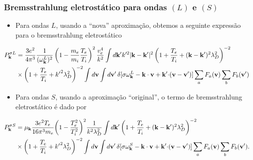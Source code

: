 \documentclass[10pt,aspectratio=1610,lualatex]{beamer}
\begin{document}
\begin{frame}
  \frametitle{Bremsstrahlung eletrostático para ondas $(L)$ e $(S)$}
  \begin{itemize}
    \item Para ondas $L$, usando a ``nova'' aproximação, obtemos a seguinte
    expressão para o bremsstrahlung eletrostático
  \end{itemize}
   \vspace{0.1cm}
    \begin{equation*}
    \label{PkL}
    \begin{split}
      P_{\bf k}^{\sigma L} &=
      \frac{3e^2}{4\pi^3}\frac{1}{(\omega_{\bf k}^L)^2}
      \left(1-\frac{m_e}{m_i}\frac{T_e}{T_i}\right)^2\frac{v_e^4}{k^2}
      \int d{\bf k}'k'^2|{\bf k- k'}|^2\left(1+\frac{T_e}{T_i}
	+({\bf k}-{\bf k}')^2\lambda_D^2\right)^{-2}\\
      &\times\left(1+\frac{T_e}{T_i} +{k'}^2\lambda_D^2\right)^{-2}
      \int d{\bf v}\int d{\bf v}'\,
      \delta[\sigma \omega_{\bf k}^L-{\bf k \cdot v}
      +{\bf k'\cdot}({\bf v}-{\bf v '})]
      \sum_aF_a({\bf v})\sum_bF_b({\bf v '})
    \end{split}
  \end{equation*}\pause
  \begin{itemize}
    \item Para ondas $S$, usando a aproximação ``original'', o termo
    de bremsstrahlung eletrostático é dado por
  \end{itemize}
   \vspace{0.1cm}
  \begin{equation*}
    \label{PkS}
    \begin{split}
      P_{\bf k}^{\sigma S} &= \mu_{\bf k}\frac{3e^2T_e}{16\pi^3m_e}
      \biggl(1-\frac{T_e^2}{T_i^2}\biggr)^2\frac{1}{k^2\lambda_D^2}
      \int d{\bf k '}\left(1+\frac{T_e}{T_i}
	+({\bf k}-{\bf k '})^2\lambda_D^2\right)^{-2}\\
      & \times\left(1+\frac{T_e}{T_i}
	+{k'}^2\lambda_D^2\right)^{-2}\int d{\bf v}\int d{\bf v '}\,
      \delta[\sigma\omega_{\bf k}^S-{\bf k \cdot v}
      +{\bf k '\cdot}({\bf v}-{\bf v '})] \sum_a F_a({\bf v})\sum_b
      F_b({\bf v '}).
    \end{split}
  \end{equation*}
\end{frame}
\end{document}
